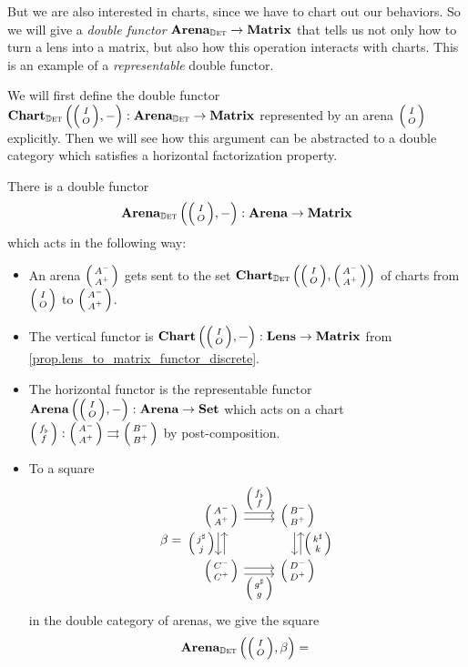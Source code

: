 \documentclass[DynamicalBook]{subfiles}
\begin{document}
 But we are also interested in charts, since we have to chart out our
behaviors. So we will give a \emph{double functor} $\textbf{Arena}_{\mathbb{D}\textsc{et}} \to
\textbf{Matrix}$ that tells us not only how to turn a lens into a matrix, but also
how this operation interacts with charts. This is an example of a
\emph{representable} double functor.


We will first define the double functor $\Cat{Chart}_{\determ}\left( \lens{I}{O}, -
\right) : \Cat{Arena}_{\determ} \to \Cat{Matrix}$ represented by an arena $\lens{I}{O}$
explicitly. Then we will see how this argument can be abstracted to a double
category which satisfies a horizontal factorization property.

\begin{proposition}\label{prop.representable_double_functor}
  There is a double functor
  $$\Cat{Arena}_{\determ}\left( \littlelens{I}{O}, -
\right) : \Cat{Arena} \to \Cat{Matrix}$$
which acts in the following way:
\begin{itemize}
  \item An arena $\lens{A^-}{A^+}$ gets sent to the set $\Cat{Chart}_{\determ}\left(
      \lens{I}{O}, \lens{A^-}{A^+} \right)$ of charts from $\lens{I}{O}$ to $\lens{A^-}{A^+}$.
  \item The vertical functor is $\Cat{Chart}\left( \lens{I}{O}, - \right) :
    \Cat{Lens} \to \Cat{Matrix}$ from \cref{prop.lens_to_matrix_functor_discrete}.
  \item The horizontal functor is the representable functor $\Cat{Arena}\left(
      \lens{I}{O}, - \right) : \Cat{Arena} \to \smset$ which acts on a chart
    $\lens{f_{\flat}}{f} : \lens{A^-}{A^+} \tto \lens{B^-}{B^+}$ by
    post-composition.
  \item To a square
    \[ \beta = 
      \begin{tikzcd}
        \littlelens{A^-}{A^+} \ar[r, shift left, "\littlelens{f_{\flat}}{f}"] \ar[r, shift
        right] \ar[d, shift right, "\littlelens{j^{\sharp}}{j}"'] \ar[d, shift left,
        leftarrow] & \littlelens{B^-}{B^+} \ar[d, shift left, leftarrow,
        "\littlelens{k^{\sharp}}{k}"] \ar[d, shift right]\\
        \littlelens{C^-}{C^+} \ar[r, shift right, "\littlelens{g^{\sharp}}{g}"'] \ar[r,
        shift left] & \littlelens{D^-}{D^+}
      \end{tikzcd}
    \]
    in the double category of arenas, we give the square
    \[\Cat{Arena}_{\determ}\left(\littlelens{I}{O}, \beta \right)  =
      \begin{tikzcd}

\end{tikzcd}\]
\end{itemize}
\end{proposition}
\end{document}
